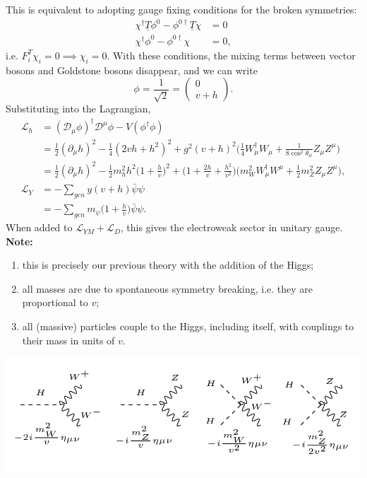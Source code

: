 This is equivalent to adopting gauge fixing conditions for the broken symmetries:
\begin{equation}
\begin{split}
\chi^\dagger \underline{T} \phi^0 - \phi^{0 \dagger} \underline{T} \chi &= 0 \\
\chi^\dagger \phi^0 - \phi^{0 \dagger} \chi &= 0,
\end{split}
\end{equation}
i.e. $F_i^T\chi_i=0 \implies \chi_i=0$. With these conditions, the mixing terms between vector bosons and Goldstone bosons disappear, and we can write
\[\phi = \frac{1}{\sqrt{2}} = \left( \begin{array}{cc}
0   \\
v + h  \end{array} \right). \]
Substituting into the Lagrangian, 
\begin{equation}
\begin{split}
\mathcal{L}_h &= (\mathcal{D}_\mu \phi)^\dagger \mathcal{D}^\mu \phi - V(\phi^\dagger \phi) \\
&= \frac{1}{2}(\partial_\mu h)^2 - \frac{1}{4}(2vh + h^2)^2 + g^2(v+h)^2 \bigg(\frac{1}{4} W_\mu^\dagger W_\mu + \frac{1}{8\cos^2\theta_w} Z_\mu Z^\mu \bigg) \\
&= \frac{1}{2}(\partial_\mu h)^2 -\frac{1}{2}m_h^2h^2\bigg(1 + \frac{h}{v}\bigg)^2 + \bigg(1+ \frac{2h}{v} + \frac{h^2}{v^2}\bigg)\bigg(m_W^2 W_\mu^\dagger W^\mu + \frac{1}{2}m_Z^2 Z_\mu Z^\mu\bigg), \\
\mathcal{L}_Y &= -\sum_{gen} y(v+h)\bar{\psi}\psi \\
&= -\sum_{gen} m_\psi \bigg(1 +\frac{h}{v}\bigg)\bar{\psi}\psi.
\end{split}
\end{equation}
When added to $\mathcal{L}_{YM} + \mathcal{L}_D$, this gives the electroweak sector in unitary gauge.
\textbf{Note:}
\begin{enumerate}
\item this is precisely our previous theory with the addition of the Higgs;
\item all masses are due to spontaneous symmetry breaking, i.e. they are proportional to $v$;
\item all (massive) particles couple to the Higgs, including itself, with couplings to their mass in units of $v$.
\end{enumerate}
  \includegraphics[width=\linewidth]{figs/31a.png}
